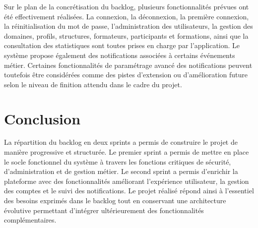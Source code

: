 \documentclass[12pt,a4paper]{report}
\begin{document}
Sur le plan de la concrétisation du backlog, plusieurs fonctionnalités prévues ont été effectivement réalisées. La connexion, la déconnexion, la première connexion, la réinitialisation du mot de passe, l'administration des utilisateurs, la gestion des domaines, profils, structures, formateurs, participants et formations, ainsi que la consultation des statistiques sont toutes prises en charge par l'application. Le système propose également des notifications associées à certains événements métier. Certaines fonctionnalités de paramétrage avancé des notifications peuvent toutefois être considérées comme des pistes d'extension ou d'amélioration future selon le niveau de finition attendu dans le cadre du projet.

\section{Conclusion}
La répartition du backlog en deux sprints a permis de construire le projet de manière progressive et structurée. Le premier sprint a permis de mettre en place le socle fonctionnel du système à travers les fonctions critiques de sécurité, d'administration et de gestion métier. Le second sprint a permis d'enrichir la plateforme avec des fonctionnalités améliorant l'expérience utilisateur, la gestion des comptes et le suivi des notifications. Le projet réalisé répond ainsi à l'essentiel des besoins exprimés dans le backlog tout en conservant une architecture évolutive permettant d'intégrer ultérieurement des fonctionnalités complémentaires.
\end{document}

